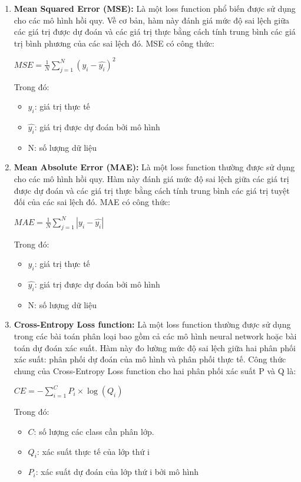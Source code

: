 \begin{enumerate}
    \item \textbf{Mean Squared Error (MSE):} Là một loss function phổ biến được sử dụng cho các mô hình hồi quy. Về cơ bản, hàm này đánh giá mức độ sai lệch giữa các giá trị được dự đoán và các giá trị thực bằng cách tính trung bình các giá trị bình phương của các sai lệch đó. MSE có công thức:
    \begin{center}
        \large $MSE = \frac{1}{N}\sum_{j=1}^{N}(y_{i}-\hat{y_{i}})^2$
    \end{center}
    Trong đó:
    \begin{itemize}
        \item $y_{i}$: giá trị thực tế
        \item $\hat{y_{i}}$: giá trị được dự đoán bởi mô hình
        \item N: số lượng dữ liệu
    \end{itemize}
    \item \textbf{Mean Absolute Error (MAE):} Là một loss function thường được sử dụng cho các mô hình hồi quy. Hàm này đánh giá mức độ sai lệch giữa các giá trị được dự đoán và các giá trị thực bằng cách tính trung bình các giá trị tuyệt đối của các sai lệch đó. MAE có công thức: 
    \begin{center}
        \large $MAE = \frac{1}{N}\sum_{j=1}^{N}\left| y_{i}-\hat{y_{i}} \right|$
    \end{center}
    Trong đó:
    \begin{itemize}
        \item $y_{i}$: giá trị thực tế
        \item $\hat{y_{i}}$: giá trị được dự đoán bởi mô hình
        \item N: số lượng dữ liệu
    \end{itemize}
    \item \textbf{Cross-Entropy Loss function:} Là một loss function thường được sử dụng trong các bài toán phân loại bao gồm cả các mô hình neural network hoặc bài toán dự đoán xác suất. Hàm này đo lường mức độ sai lệch giữa hai phân phối xác suất: phân phối dự đoán của mô hình và phân phối thực tế. Công thức chung của Cross-Entropy Loss function cho hai phân phối xác suất P và Q là: 
    \begin{center}
        \large $CE = - \sum_{i=1}^{C} P_{i}\times \log(Q_{i})$
    \end{center}
    Trong đó:
    \begin{itemize}
        \item $C$: số lượng các class cần phân lớp.
        \item $Q_{i}$: xác suất thực tế của lớp thứ i
        \item $P_{i}$: xác suất dự đoán của lớp thứ i bởi mô hình
    \end{itemize}
\end{enumerate}
